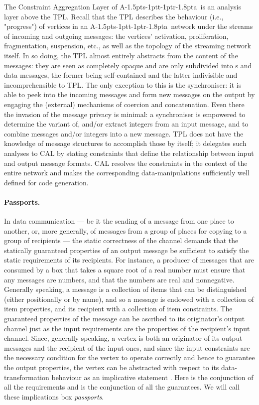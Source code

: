 \documentclass[11pt]{report}
\def\ak{{\textsf{A\kern-1.5pts\kern-1ptt\kern-1ptr\kern-1.8pta}}\kern-2pt{\it K\kern-2ptahn}}
\begin{document}
The Constraint Aggregation Layer of \ak\ is an analysis layer above the TPL. Recall that the TPL describes the behaviour (i.e., "progress") of vertices in an \ak\ network under the streams of incoming and outgoing messages: the vertices' activation, proliferation, fragmentation, suspension, etc., as well as the topology of the streaming network itself. In so doing, the TPL almost entirely abstracts from the content of the messages: they are seen as completely opaque and are only subdivided into s and data messages, the former being self-contained and the latter indivisible and incomprehensible to TPL. The only exception to this is the synchroniser: it is able to peek into the incoming messages and form new messages on the output by engaging the (external) mechanisms of coercion and concatenation. Even there the invasion of the message privacy is minimal: a synchroniser is empowered to determine the variant of, and/or extract integers from an input message, and to combine messages and/or integers into a new message. TPL does not have the knowledge of message structures to accomplish those by itself; it delegates such analyses to CAL by stating constraints that define the relationship between input and output message formats. CAL resolves the constraints in the context of the entire network and makes the corresponding data-manipulations sufficiently well defined for code generation.

\paragraph{Passports.}In data communication --- be it the sending of a message from one place to another, or,  more generally,  of messages from a group of places for copying to a group of recipients --- the static correctness of the channel demands that the statically guaranteed properties of an output message be sufficient to satisfy the static requirements of its recipients. For instance, a producer of messages that are consumed by a box that takes a square root of a real number must ensure that any messages are numbers, and that the numbers are real and nonnegative. Generally speaking, a message is a collection of items that can be distinguished (either positionally or by name), and so a message is endowed with a collection of item properties, and its recipient with a collection of item constraints. The guaranteed properties of the message can be ascribed to its originator's output channel just as the input requirements are the properties of the recipient's input channel. Since, generally speaking, a vertex is both an originator of its output messages and the recipient of the input ones, and since the input constraints are the necessary condition for the vertex to operate correctly and hence to guarantee the output properties, the vertex can be abstracted with respect to its data-transformation behaviour as an implicative statement .  Here  is the conjunction of all the requirements and  is the conjunction of all the guarantees. We will call these implications box {\em passports}.
\end{document}
